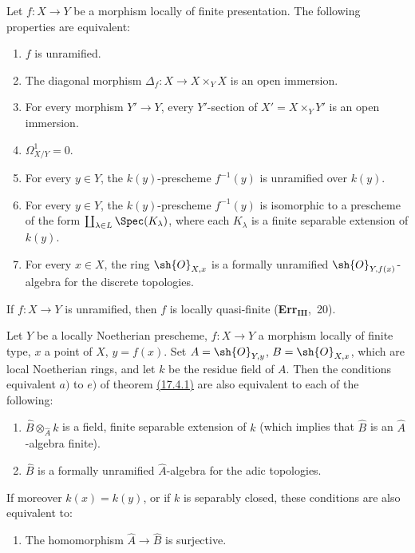 \begin{corollary}[17.4.2]
\label{IV.17.4.2}
Let $f:X\to Y$ be a morphism locally of finite presentation.
The following properties are equivalent:
\begin{enumerate}[label=(\alph*)]
  \item $f$ is unramified.
  \item The diagonal morphism $\Delta_f:X\to X\times_Y X$ is an open immersion.
  \item[b')] For every morphism $Y'\to Y$, every $Y'$-section of $X'=X\times_Y Y'$ is an open immersion.
  \item $\Omega^1_{X/Y}=0$.
  \item For every $y\in Y$, the $k(y)$-prescheme $f^{-1}(y)$ is unramified over $k(y)$.
  \item[d')] For every $y\in Y$, the $k(y)$-prescheme $f^{-1}(y)$ is isomorphic to a prescheme of the form $\coprod_{\lambda\in L}\Spec(K_\lambda)$, where each $K_\lambda$ is a finite separable extension of $k(y)$.
  \item For every $x\in X$, the ring $\sh{O}_{X,x}$ is a formally unramified $\sh{O}_{Y,f(x)}$-algebra for the discrete topologies.
\end{enumerate}
\end{corollary}

\begin{corollary}[17.4.3]
\label{IV.17.4.3}
If $f:X\to Y$ is unramified, then $f$ is locally quasi-finite (\textbf{Err}$_\textbf{III}$,~20).
\end{corollary}

\begin{proposition}[17.4.4]
\label{IV.17.4.4}
Let $Y$ be a locally Noetherian prescheme, $f:X\to Y$ a morphism locally of finite type, $x$ a point of $X$, $y=f(x)$.
Set $A=\sh{O}_{Y,y}$, $B=\sh{O}_{X,x}$, which are local Noetherian rings, and let $k$ be the residue field of $A$.
Then the conditions equivalent $a)$ to $e)$ of theorem {\hyperlink{ega4.c04.thm.17-4-1}{(17.4.1)}} are also equivalent to each of the following:
\begin{enumerate}
  \item[f)] $\hat{B}\otimes_{\hat{A}}k$ is a field, finite separable extension of $k$ (which implies that $\hat{B}$ is an $\hat{A}$-algebra finite).
  \item[f')] $\hat{B}$ is a formally unramified $\hat{A}$-algebra for the adic topologies.
\end{enumerate}
If moreover $k(x)=k(y)$, or if $k$ is separably closed, these conditions are also equivalent to:
\begin{enumerate}
  \item[f'')] The homomorphism $\hat{A}\to\hat{B}$ is surjective.
\end{enumerate}
\end{proposition}


